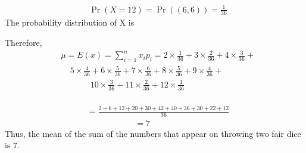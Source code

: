 \documentclass{beamer}
\theoremstyle{remark}
\numberwithin{equation}{section}
\numberwithin{figure}{section}
\numberwithin{table}{section}
\begin{document}
\begin{frame}
\begin{align}
&\Pr(X = 12) = \Pr({(6,6)}) = \frac{1}{36} 
\end{align}    
The probability distribution of X is  
\begin{table}[ht!]  
\resizebox{12cm}{!}{
\label{Table 1}	
}
\end{table}
Therefore,\\
\begin{align}
    &\mu = E(x) = \sum_{i=1}^{n}{x_i}{p_i}  = 2\times\frac{1}{36}+3\times\frac{2}{36}+4\times\frac{3}{36}+\nonumber\\
    &~~~~~5\times\frac{4}{36}+6\times\frac{5}{36}+7\times\frac{6}{36}+8\times\frac{5}{36}+9\times\frac{4}{36}+\nonumber\\
    &~~~~~~~~~~~~~~~~10\times\frac{3}{36}+11\times\frac{2}{36}+12\times\frac{1}{36}\\
\end{align}
\end{frame}
\begin{frame}
\begin{align}
    &=\frac{2+6+12+20+30+42+40+36+30+22+12}{36}\\
    &~~~~~~~~~~~~~~~~~~~~~~~~~~= 7
\end{align}
Thus, the mean of the sum of the numbers that appear on throwing two fair dice is 7.
\end{frame}
\end{document}

